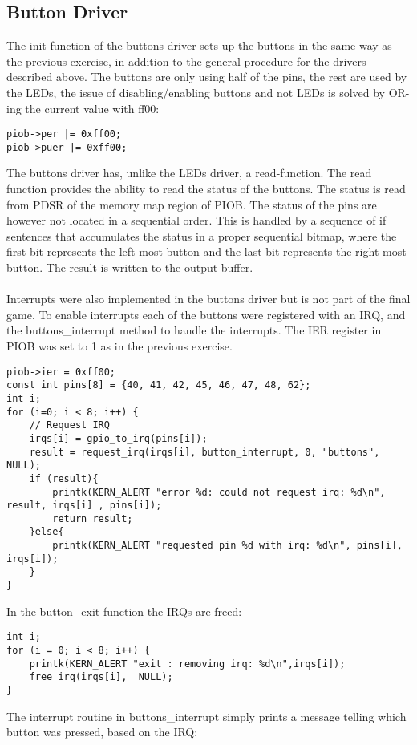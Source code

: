 \subsection{Button Driver}
The init function of the buttons driver sets up the buttons in the same way as the previous exercise, in addition to the general procedure for the drivers described above. The buttons are only using half of the pins, the rest are used by the LEDs, the issue of disabling/enabling buttons and not LEDs is solved by OR-ing the current value with ff00:
\\
\begin{lstlisting}
piob->per |= 0xff00;
piob->puer |= 0xff00;
\end{lstlisting}
The buttons driver has, unlike the LEDs driver, a read-function. The read function provides the ability to read the status of the buttons. The status is read from PDSR of the memory map region of PIOB. The status of the pins are however not located in a sequential order. This is handled by a sequence of if sentences that accumulates the status in a proper sequential bitmap, where the first bit represents the left most button and the last bit represents the right most button. The result is written to the output buffer.\\
\\
Interrupts were also implemented in the buttons driver but is not part of the final game. To enable interrupts each of the buttons were registered with an IRQ, and the buttons\_interrupt method to handle the interrupts. The IER register in PIOB was set to 1 as in the previous exercise.
\\
\begin{lstlisting}
piob->ier = 0xff00;
const int pins[8] = {40, 41, 42, 45, 46, 47, 48, 62};
int i;
for (i=0; i < 8; i++) {
	// Request IRQ
	irqs[i] = gpio_to_irq(pins[i]);
	result = request_irq(irqs[i], button_interrupt, 0, "buttons", NULL);
	if (result){
		printk(KERN_ALERT "error %d: could not request irq: %d\n", result, irqs[i] , pins[i]);
		return result;
	}else{
		printk(KERN_ALERT "requested pin %d with irq: %d\n", pins[i], irqs[i]);
	}
}
\end{lstlisting}
In the button\_exit function the IRQs are freed:
\\
\begin{lstlisting}
int i;
for (i = 0; i < 8; i++) {
	printk(KERN_ALERT "exit : removing irq: %d\n",irqs[i]);
	free_irq(irqs[i],  NULL);
}
\end{lstlisting}
The interrupt routine in buttons\_interrupt simply prints a message telling which button was pressed, based on the IRQ:
